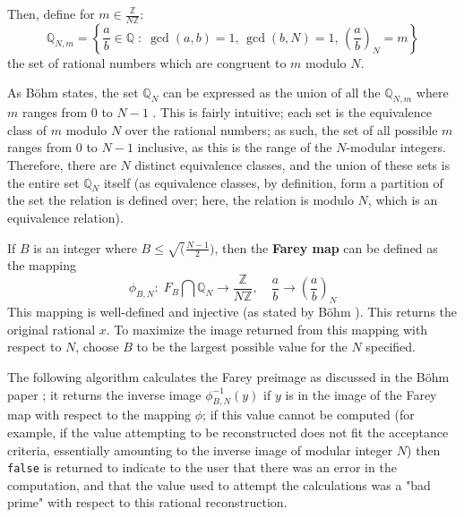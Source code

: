 \documentclass[letterpaper,12pt,titlepage,oneside,final]{book}
\begin{document}
Then, define for ${m \in \frac{\mathbb{Z}}{N\mathbb{Z}}}$:
\begin{equation*}
  \mathbb{Q}_{N, m} = \left\{\frac{a}{b} \in \mathbb{Q}\; : \; \gcd(a, b) = 1,\, \gcd(b, N) = 1,\, \left(\frac{a}{b}\right)_N = m\right\}
\end{equation*}
the set of rational numbers which are congruent to ${m}$ modulo ${N}$.  

As B\"ohm states, the set ${\mathbb{Q}_N}$ can be expressed as the union of all the ${\mathbb{Q}_{N, m}}$ where ${m}$ ranges from 0 to ${N - 1}$ \cite{Bohm}.  This is fairly intuitive; each set is the equivalence class of ${m}$ modulo ${N}$ over the rational numbers; as such, the set of all possible ${m}$ ranges from 0 to ${N - 1}$ inclusive, as this is the range of the ${N}$-modular integers.  Therefore, there are ${N}$ distinct equivalence classes, and the union of these sets is the entire set ${\mathbb{Q}_N}$ itself (as equivalence classes, by definition, form a partition of the set the relation is defined over; here, the relation is modulo ${N}$, which is an equivalence relation).  

If ${B}$ is an integer where ${B \leq \sqrt(\frac{N - 1}{2})}$, then the \textbf{Farey map} can be defined as the mapping
\begin{equation*}
  \phi_{B, N}:\; F_B \bigcap \mathbb{Q}_N \rightarrow \frac{\mathbb{Z}}{N\mathbb{Z}},\quad \frac{a}{b} \rightarrow \left(\frac{a}{b}\right)_N
\end{equation*}
This mapping is well-defined and injective (as stated by B\"ohm \cite{Bohm}).  This returns the original rational ${x}$.  To maximize the image returned from this mapping with respect to ${N}$, choose ${B}$ to be the largest possible value for the ${N}$ specified.

The following algorithm calculates the Farey preimage as discussed in the B\"ohm paper \cite{Bohm}; it returns the inverse image ${\phi_{B, N}^{-1}(y)}$ if ${y}$ is in the image of the Farey map with respect to the mapping ${\phi}$; if this value cannot be computed (for example, if the value attempting to be reconstructed does not fit the acceptance criteria, essentially amounting to the inverse image of modular integer ${N}$) then \texttt{false} is returned to indicate to the user that there was an error in the computation, and that the value used to attempt the calculations was a "bad prime" with respect to this rational reconstruction.
\end{document}
